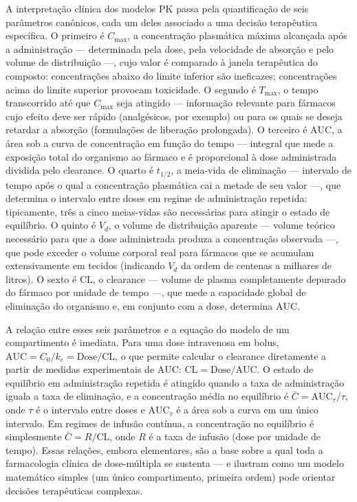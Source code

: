 A interpretação clínica dos modelos PK passa pela quantificação de seis parâmetros canônicos, cada um deles associado a uma decisão terapêutica específica. O primeiro é $C_{\max}$, a concentração plasmática máxima alcançada após a administração --- determinada pela dose, pela velocidade de absorção e pelo volume de distribuição ---, cujo valor é comparado à janela terapêutica do composto: concentrações abaixo do limite inferior são ineficazes; concentrações acima do limite superior provocam toxicidade. O segundo é $T_{\max}$, o tempo transcorrido até que $C_{\max}$ seja atingido --- informação relevante para fármacos cujo efeito deve ser rápido (analgésicos, por exemplo) ou para os quais se deseja retardar a absorção (formulações de liberação prolongada). O terceiro é $\mathrm{AUC}$, a área sob a curva de concentração em função do tempo --- integral que mede a exposição total do organismo ao fármaco e é proporcional à dose administrada dividida pelo clearance. O quarto é $t_{1/2}$, a meia-vida de eliminação --- intervalo de tempo após o qual a concentração plasmática cai a metade de seu valor ---, que determina o intervalo entre doses em regime de administração repetida: tipicamente, três a cinco meias-vidas são necessárias para atingir o estado de equilíbrio. O quinto é $V_d$, o volume de distribuição aparente --- volume teórico necessário para que a dose administrada produza a concentração observada ---, que pode exceder o volume corporal real para fármacos que se acumulam extensivamente em tecidos (indicando $V_d$ da ordem de centenas a milhares de litros). O sexto é $\mathrm{CL}$, o clearance --- volume de plasma completamente depurado do fármaco por unidade de tempo ---, que mede a capacidade global de eliminação do organismo e, em conjunto com a dose, determina $\mathrm{AUC}$.

A relação entre esses seis parâmetros e a equação do modelo de um compartimento é imediata. Para uma dose intravenosa em bolus, $\mathrm{AUC} = C_0/k_e = \mathrm{Dose}/\mathrm{CL}$, o que permite calcular o clearance diretamente a partir de medidas experimentais de $\mathrm{AUC}$: $\mathrm{CL} = \mathrm{Dose}/\mathrm{AUC}$. O estado de equilíbrio em administração repetida é atingido quando a taxa de administração iguala a taxa de eliminação, e a concentração média no equilíbrio é $\bar{C} = \mathrm{AUC}_{\tau}/\tau$, onde $\tau$ é o intervalo entre doses e $\mathrm{AUC}_{\tau}$ é a área sob a curva em um único intervalo. Em regimes de infusão contínua, a concentração no equilíbrio é simplesmente $\bar{C} = R/\mathrm{CL}$, onde $R$ é a taxa de infusão (dose por unidade de tempo). Essas relações, embora elementares, são a base sobre a qual toda a farmacologia clínica de dose-múltipla se sustenta --- e ilustram como um modelo matemático simples (um único compartimento, primeira ordem) pode orientar decisões terapêuticas complexas.


